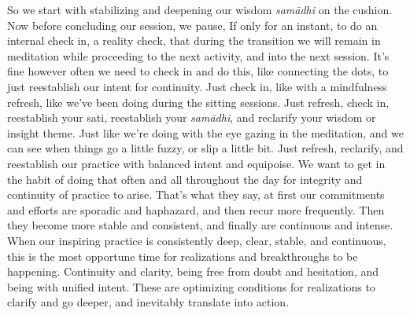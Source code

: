 \documentclass[12pt,openany]{book}
\begin{document}
So we start with stabilizing and deepening our wisdom \textit{samādhi} on the cushion. Now before concluding our session, we pause, If only for an instant, to do an internal check in, a reality check, that during the transition we will remain in meditation while proceeding to the next activity, and into the next session. It's fine however often we need to check in and do this, like connecting the dots, to just reestablish our intent for continuity. Just check in, like with a mindfulness refresh, like we've been doing during the sitting sessions. Just refresh, check in, reestablish your sati, reestablish your \textit{samādhi}, and reclarify your wisdom or insight theme. Just like we're doing with the eye gazing in the meditation, and we can see when things go a little fuzzy, or slip a little bit. Just refresh, reclarify, and reestablish our practice with balanced intent and equipoise. We want to get in the habit of doing that often and all throughout the day for integrity and continuity of practice to arise. That's what they say, at first our commitments and efforts are sporadic and haphazard, and then recur more frequently. Then they become more stable and consistent, and finally are continuous and intense. When our inspiring practice is consistently deep, clear, stable, and continuous, this is the most opportune time for realizations and breakthroughs to be happening. Continuity and clarity, being free from doubt and hesitation, and being with unified intent. These are optimizing conditions for realizations to clarify and go deeper, and inevitably translate into action. 
\end{document}
